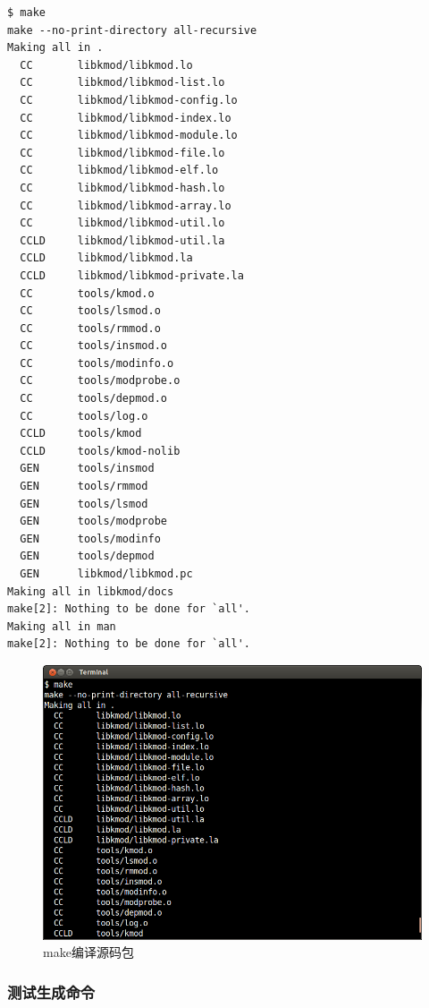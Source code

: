 \documentclass[11pt,a4paper]{article}
\makeatletter
\def\maxwidth{\ifdim\Gin@nat@width>\linewidth\linewidth
\else\Gin@nat@width\fi}
\let\Oldincludegraphics\includegraphics
\renewcommand{\includegraphics}[1]{\Oldincludegraphics[width=\maxwidth]{#1}}
\makeatother
\begin{document}
{\begin{shaded}\begin{verbatim}
$ make
make --no-print-directory all-recursive
Making all in .
  CC       libkmod/libkmod.lo
  CC       libkmod/libkmod-list.lo
  CC       libkmod/libkmod-config.lo
  CC       libkmod/libkmod-index.lo
  CC       libkmod/libkmod-module.lo
  CC       libkmod/libkmod-file.lo
  CC       libkmod/libkmod-elf.lo
  CC       libkmod/libkmod-hash.lo
  CC       libkmod/libkmod-array.lo
  CC       libkmod/libkmod-util.lo
  CCLD     libkmod/libkmod-util.la
  CCLD     libkmod/libkmod.la
  CCLD     libkmod/libkmod-private.la
  CC       tools/kmod.o
  CC       tools/lsmod.o
  CC       tools/rmmod.o
  CC       tools/insmod.o
  CC       tools/modinfo.o
  CC       tools/modprobe.o
  CC       tools/depmod.o
  CC       tools/log.o
  CCLD     tools/kmod
  CCLD     tools/kmod-nolib
  GEN      tools/insmod
  GEN      tools/rmmod
  GEN      tools/lsmod
  GEN      tools/modprobe
  GEN      tools/modinfo
  GEN      tools/depmod
  GEN      libkmod/libkmod.pc
Making all in libkmod/docs
make[2]: Nothing to be done for `all'.
Making all in man
make[2]: Nothing to be done for `all'.
\end{verbatim}\end{shaded}}
\begin{figure}[htbp]
\centering
\includegraphics{./pictures/1-4-make.png}
\caption{make编译源码包}
\end{figure}

\subsubsection{测试生成命令}
\end{document}
